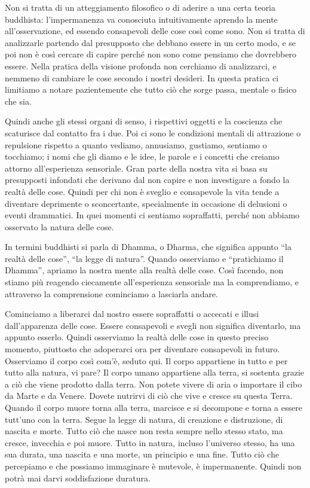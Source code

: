 Non si tratta di un atteggiamento filosofico o di aderire a una certa
teoria buddhista: l'impermanenza va conosciuta intuitivamente aprendo la
mente all'osservazione, ed essendo consapevoli delle cose così come
sono. Non si tratta di analizzarle partendo dal presupposto che debbano
essere in un certo modo, e se poi non è così cercare di capire perché
non sono come pensiamo che dovrebbero essere. Nella pratica della
visione profonda non cerchiamo di analizzarci, e nemmeno di cambiare le
cose secondo i nostri desideri. In questa pratica ci limitiamo a notare
pazientemente che tutto ciò che sorge passa, mentale o fisico che sia.

Quindi anche gli stessi organi di senso, i rispettivi oggetti e la
coscienza che scaturisce dal contatto fra i due. Poi ci sono le
condizioni mentali di attrazione o repulsione rispetto a quanto vediamo,
annusiamo, gustiamo, sentiamo o tocchiamo; i nomi che gli diamo e le
idee, le parole e i concetti che creiamo attorno all'esperienza
sensoriale. Gran parte della nostra vita si basa su presupposti
infondati che derivano dal non capire e non investigare a fondo la
realtà delle cose. Quindi per chi non è sveglio e consapevole la vita
tende a diventare deprimente o sconcertante, specialmente in occasione
di delusioni o eventi drammatici. In quei momenti ci sentiamo
sopraffatti, perché non abbiamo osservato la natura delle cose.

In termini buddhisti si parla di Dhamma, o Dharma, che significa appunto
“la realtà delle cose”, “la legge di natura”. Quando osserviamo e
“pratichiamo il Dhamma”, apriamo la nostra mente alla realtà delle cose.
Così facendo, non stiamo più reagendo ciecamente all'esperienza
sensoriale ma la comprendiamo, e attraverso la comprensione cominciamo a
lasciarla andare.

Cominciamo a liberarci dal nostro essere sopraffatti o accecati e illusi
dall'apparenza delle cose. Essere consapevoli e svegli non significa
diventarlo, ma appunto esserlo. Quindi osserviamo la realtà delle cose
in questo preciso momento, piuttosto che adoperarci ora per diventare
consapevoli in futuro. Osserviamo il corpo così com'è, seduto qui. Il
corpo appartiene in tutto e per tutto alla natura, vi pare? Il corpo
umano appartiene alla terra, si sostenta grazie a ciò che viene prodotto
dalla terra. Non potete vivere di aria o importare il cibo da Marte e da
Venere. Dovete nutrirvi di ciò che vive e cresce su questa Terra. Quando
il corpo muore torna alla terra, marcisce e si decompone e torna a
essere tutt'uno con la terra. Segue la legge di natura, di creazione e
distruzione, di nascita e morte. Tutto ciò che nasce non resta sempre
nello stesso stato, ma cresce, invecchia e poi muore. Tutto in natura,
incluso l'universo stesso, ha una sua durata, una nascita e una morte,
un principio e una fine. Tutto ciò che percepiamo e che possiamo
immaginare è mutevole, è impermanente. Quindi non potrà mai darvi
soddisfazione duratura.

